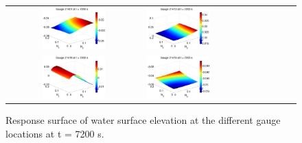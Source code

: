 \begin{figure}[h]
\centering

\begin{tabular}{clcl}
\includegraphics[width=0.5\textwidth]{./figures/response_i1_t2.pdf} &
\includegraphics[width=0.5\textwidth]{./figures/response_i2_t2.pdf} \\
\includegraphics[width=0.5\textwidth]{./figures/response_i3_t2.pdf} &
\includegraphics[width=0.5\textwidth]{./figures/response_i4_t2.pdf}
\end{tabular}
\caption{Response surface of water surface elevation at the different gauge locations at t = 7200 s.}
\label{fig:response2}
\end{figure}
